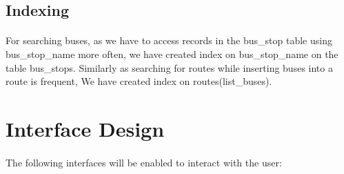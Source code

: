 \documentclass[11pt]{article}
\begin{document}
\subsection{Indexing}
\paragraph{}
For searching buses, as we have to access records in the bus\_stop table using bus\_stop\_name more often, we have created index on bus\_stop\_name on the table bus\_stops. Similarly as searching for routes while inserting buses into a route is frequent, We have created index on routes(list\_buses).


\section{Interface Design}
\paragraph{}
The following interfaces will be enabled to interact with the user:
\end{document}
